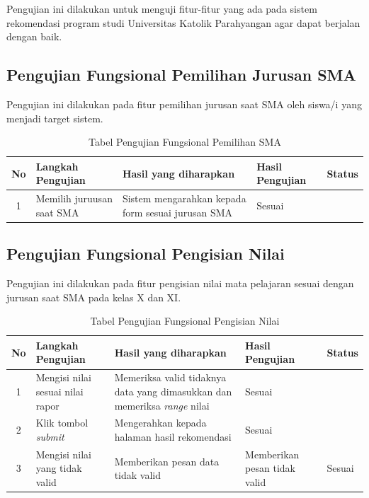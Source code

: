 Pengujian ini dilakukan untuk menguji fitur-fitur yang ada pada sistem rekomendasi program studi Universitas Katolik Parahyangan agar dapat berjalan dengan baik.

\subsection{Pengujian Fungsional Pemilihan Jurusan SMA}
\label{subsec:pengujian fungsional}

Pengujian ini dilakukan pada fitur pemilihan jurusan saat SMA oleh siswa/i yang menjadi target sistem.

\begin{table}[H]
    \centering
    \begin{tabular}{|c|p{3.5cm}|p{3.5cm}|p{3.5cm}|p{2cm}|}
        \hline
        No & Langkah Pengujian & Hasil yang diharapkan & Hasil Pengujian & Status \\
        \hline
        1 & Memilih juruusan saat SMA & Sistem mengarahkan kepada form sesuai jurusan SMA & Sesuai\\
        \hline
    \end{tabular}
    \caption{Tabel Pengujian Fungsional Pemilihan SMA}
    \label{tab:tabel pengujian fungsional pemilihan SMA}
\end{table}

\subsection{Pengujian Fungsional Pengisian Nilai}
\label{subsec:pengujian fungsional}

Pengujian ini dilakukan pada fitur pengisian nilai mata pelajaran sesuai dengan jurusan saat SMA pada kelas X dan XI. 

\begin{table}[H]
    \centering
    \begin{tabular}{|c|p{3.5cm}|p{3.5cm}|p{3.5cm}|p{2cm}|}
        \hline
        No & Langkah Pengujian & Hasil yang diharapkan & Hasil Pengujian & Status \\
        \hline
        1 & Mengisi nilai sesuai nilai rapor & Memeriksa valid tidaknya data yang dimasukkan dan memeriksa \textit{range} nilai & Sesuai \\
        \hline
        2 & Klik tombol \textit{submit} & Mengerahkan kepada halaman hasil rekomendasi & Sesuai \\
        3 & Mengisi nilai yang tidak valid & Memberikan pesan data tidak valid & Memberikan pesan tidak valid & Sesuai\\
        \hline
    \end{tabular}
    \caption{Tabel Pengujian Fungsional Pengisian Nilai}
    \label{tab:tabel pengujian fungsional pengisian nilai}
\end{table}


